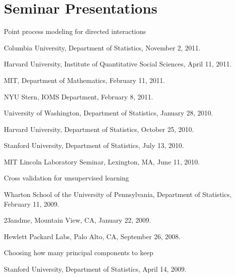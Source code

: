 \documentclass[10pt,letterpaper]{article}
\renewenvironment{itemize}{
  \begin{list}{}{
    \setlength{\leftmargin}{1.5em}
    \setlength{\itemsep}{0.25em}
    \setlength{\parskip}{0pt}
    \setlength{\parsep}{0.25em}
  }
}{
  \end{list}
}
\begin{document}
\section*{Seminar Presentations}

\begin{itemize}

\item Point process modeling for directed interactions
  \begin{itemize}
  \item Columbia University, Department of Statistics, November 2, 2011.
  \item Harvard University, Institute of Quantitative Social Sciences, April 11, 2011.
  \item MIT, Department of Mathematics, February 11, 2011.
  \item NYU Stern, IOMS Department, February 8, 2011.
  \item University of Washington, Department of Statistics, January 28, 2010.
  \item %
    Harvard University, Department of Statistics, October 25, 2010.
  \item %
    Stanford University, Department of Statistics, July 13, 2010.
  \item %
    MIT Lincoln Laboratory Seminar, Lexington, MA, June 11, 2010.
  \end{itemize}


\item Cross validation for unsupervised learning
  \begin{itemize}
    \item Wharton School of the University of Pennsylvania, Department of Statistics,
      February 11, 2009. 
    \item 23andme, Mountain View, CA, January 22, 2009.
    \item Hewlett Packard Labs, Palo Alto, CA, September 26, 2008.
  \end{itemize}

\item Choosing how many principal components to keep
  \begin{itemize}
    \item Stanford University, Department of Statistics, April 14, 2009.
  \end{itemize}

\end{itemize}
\end{document}
